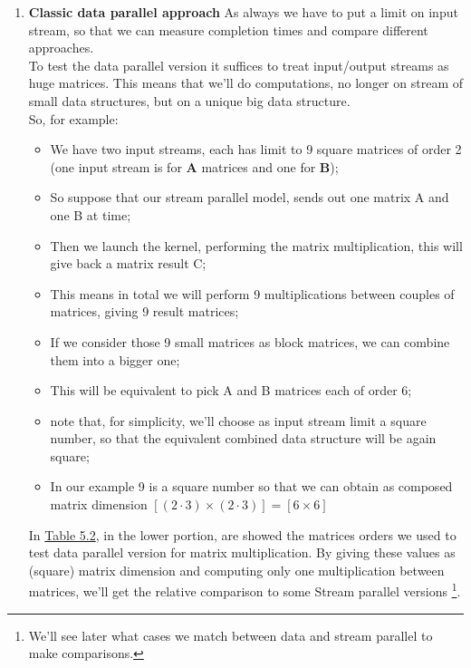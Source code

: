\begin{enumerate}
	\item \textbf{Classic data parallel approach}
	As always we have to put a limit on input stream, so that we can measure completion times and compare different approaches.\\
	To test the data parallel version it suffices to treat input/output streams as huge matrices.
	This means that we'll do computations, no longer on stream of small data structures, but on a unique big data structure.\\
	So, for example:
	\begin{itemize}
		\item We have two input streams, each has limit to 9 square matrices of order 2 (one input stream is for \textbf{A} matrices and one for \textbf{B});
		\item So suppose that our stream parallel model, sends out one matrix A and one B at time;
		\item Then we launch the kernel, performing the matrix multiplication, this will give back a matrix result C;
		\item This means in total we will perform 9 multiplications between couples of matrices, giving 9 result matrices;
		\item If we consider those 9 small matrices as block matrices, we can combine them into a bigger one;
		\item This will be equivalent to pick A and B matrices each of order 6;
		\item note that, for simplicity, we'll choose as input stream limit a square number, so that the equivalent combined data structure will be again square;
		\item In our example 9 is a square number so that we can obtain as composed matrix dimension \([(2\cdot3)\times(2\cdot3)] = [6\times6]\)  
	\end{itemize} 
	In \hyperref[tab:matdata]{Table 5.2}, in the lower portion, are showed the matrices orders we used to test data parallel version for matrix multiplication. 
	By giving these values as (square) matrix dimension and computing only one multiplication between matrices, we'll get the relative comparison to some Stream parallel versions \footnote{We'll see later what cases we match between data and stream parallel to make comparisons.}.
	

\end{enumerate}
